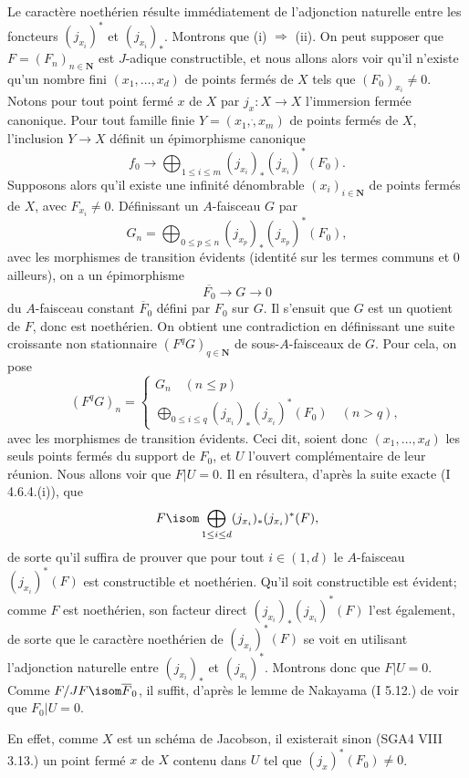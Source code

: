 Le caractère noethérien résulte immédiatement de l'adjonction naturelle entre les foncteurs $(j_{x_i})^*$ et $(j_{x_i})_*$. Montrons que (i) $\Rightarrow$ (ii). On peut supposer que $F = (F_n)_{n \in \mathbf{N}}$ est $J$-adique constructible, et nous allons alors voir qu'il n'existe qu'un nombre fini $(x_1, \dots, x_d)$ de points fermés de $X$ tels que $(F_0)_{x_i} \neq 0$. Notons pour tout point fermé $x$ de $X$ par $j_x: X \to X$ l'immersion fermée canonique. Pour tout famille finie $Y = (x_1, \dot, x_m)$ de points fermés de $X$, l'inclusion $Y \to X$ définit un épimorphisme canonique
$$
f_0 \to \bigoplus_{1 \leq i \leq m} (j_{x_i})_* (j_{x_i})^*(F_0).
$$
Supposons alors qu'il existe une infinité dénombrable $(x_i)_{i \in \mathbf{N}}$ de points fermés de $X$, avec $F_{x_i} \neq 0$. Définissant un $A$-faisceau $G$ par
$$
G_n = \bigoplus_{0 \leq p \leq n} (j_{x_p})_*(j_{x_p})^*(F_0),
$$
avec les morphismes de transition évidents (identité sur les termes communs et $0$ ailleurs), on a un épimorphisme
$$
\overline{F_0} \to G \to 0
$$
du $A$-faisceau constant $\overline{F}_0$ défini par $F_0$ sur $G$. Il s'ensuit que $G$ est un quotient de $F$, donc est noethérien. On obtient une contradiction en définissant une suite croissante non stationnaire $(F^q G)_{q \in \mathbf{N}}$ de sous-$A$-faisceaux de $G$. Pour cela, on pose
$$
(F^q G)_n = 
\begin{cases}
    G_n \quad (n \leq p) \\
    \bigoplus_{0 \leq i \leq q} (j_{x_i})_*(j_{x_i})^*(F_0) \quad (n > q),
\end{cases}
$$
avec les morphismes de transition évidents. Ceci dit, soient donc $(x_1, \dots, x_d)$ les seuls points fermés du support de $F_0$, et $U$ l'ouvert complémentaire de leur réunion. Nous allons voir que $F|U = 0$. Il en résultera, d'après la suite exacte (I 4.6.4.(i)), que 
$$
F \isom \bigoplus_{1 \leq i \leq d} (j_{x_i})_*(j_{x_i})^*(F),
$$
de sorte qu'il suffira de prouver que pour tout $i \in (1, d)$ le $A$-faisceau $(j_{x_i})^*(F)$ est constructible et noethérien. Qu'il soit constructible est évident; comme $F$ est noethérien, son facteur direct $(j_{x_i})_*(j_{x_i})^*(F)$ l'est également, de sorte que le caractère noethérien de $(j_{x_i})^*(F)$ se voit en utilisant l'adjonction naturelle entre $(j_{x_i})_*$ et $(j_{x_i})^*$. Montrons donc que $F | U = 0$. Comme $F/JF \isom \overline{F}_ 0$, il suffit, d'après le lemme de Nakayama (I 5.12.) de voir que $F_0 | U = 0$.

En effet, comme $X$ est un schéma de Jacobson, il existerait sinon (SGA4 VIII 3.13.) un point fermé $x$ de $X$ contenu dans $U$ tel que $(j_x)^*(F_0) \neq 0$.

